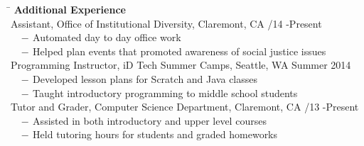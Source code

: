 \documentclass[12pt]{article}
\newcommand{\sectionNL}{\\[2pt]}
\newcommand{\customtab}{$\hspace{10pt} - \hspace{2pt}$}
\newcommand{\customtabinline}{$\hspace{23pt}$}
\begin{document}
\begin{tabbing} 
\hspace*{6.5in}\= \kill
{\textbf{Additional Experience } } \> \sectionNL
Assistant, Office of Institutional Diversity, Claremont, CA /14 -Present \\
\customtab Automated day to day office work \\
\customtab Helped plan events that promoted awareness of social justice issues \\

Programming Instructor, iD Tech Summer Camps, Seattle, WA \> Summer 2014 \\
\customtab Developed lesson plans for Scratch and Java classes \\
\customtab Taught introductory programming to  middle school students\\

Tutor and Grader, Computer Science Department, Claremont, CA /13 -Present \\ %
\customtab Assisted in both introductory and upper level courses \\
\customtab Held tutoring hours for students and graded homeworks
\end{tabbing}
\end{document}
